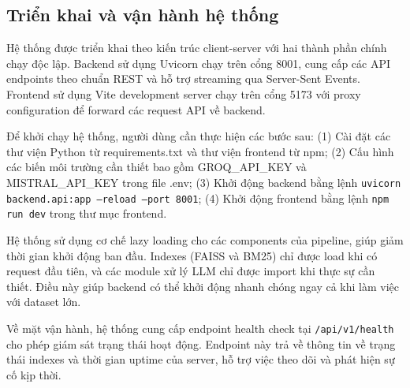 \subsection{Triển khai và vận hành hệ thống}

Hệ thống được triển khai theo kiến trúc client-server với hai thành phần chính chạy độc lập. Backend sử dụng Uvicorn chạy trên cổng 8001, cung cấp các API endpoints theo chuẩn REST và hỗ trợ streaming qua Server-Sent Events. Frontend sử dụng Vite development server chạy trên cổng 5173 với proxy configuration để forward các request API về backend.

Để khởi chạy hệ thống, người dùng cần thực hiện các bước sau: (1) Cài đặt các thư viện Python từ requirements.txt và thư viện frontend từ npm; (2) Cấu hình các biến môi trường cần thiết bao gồm GROQ_API_KEY và MISTRAL_API_KEY trong file .env; (3) Khởi động backend bằng lệnh \texttt{uvicorn backend.api:app --reload --port 8001}; (4) Khởi động frontend bằng lệnh \texttt{npm run dev} trong thư mục frontend.

Hệ thống sử dụng cơ chế lazy loading cho các components của pipeline, giúp giảm thời gian khởi động ban đầu. Indexes (FAISS và BM25) chỉ được load khi có request đầu tiên, và các module xử lý LLM chỉ được import khi thực sự cần thiết. Điều này giúp backend có thể khởi động nhanh chóng ngay cả khi làm việc với dataset lớn.

Về mặt vận hành, hệ thống cung cấp endpoint health check tại \texttt{/api/v1/health} cho phép giám sát trạng thái hoạt động. Endpoint này trả về thông tin về trạng thái indexes và thời gian uptime của server, hỗ trợ việc theo dõi và phát hiện sự cố kịp thời.
